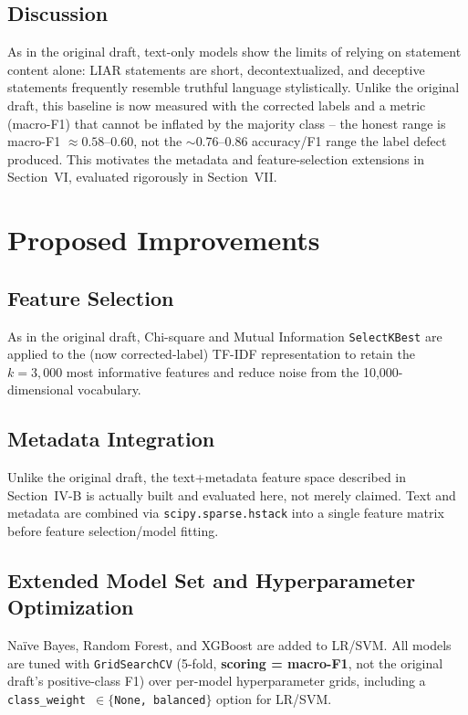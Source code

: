 \documentclass[conference]{IEEEtran}
\begin{document}
\subsection{Discussion}
As in the original draft, text-only models show the limits of relying on
statement content alone: LIAR statements are short, decontextualized, and
deceptive statements frequently resemble truthful language stylistically. Unlike
the original draft, this baseline is now measured with the corrected labels and a
metric (macro-F1) that cannot be inflated by the majority class -- the honest range
is macro-F1 $\approx 0.58$--$0.60$, not the $\sim$0.76--0.86 accuracy/F1 range the
label defect produced. This motivates the metadata and feature-selection
extensions in Section~VI, evaluated rigorously in Section~VII.

\section{Proposed Improvements}
\subsection{Feature Selection}
As in the original draft, Chi-square and Mutual Information \texttt{SelectKBest}
are applied to the (now corrected-label) TF-IDF representation to retain the
$k=3{,}000$ most informative features and reduce noise from the
10,000-dimensional vocabulary.

\subsection{Metadata Integration}
Unlike the original draft, the text+metadata feature space described in
Section~IV-B is actually built and evaluated here, not merely claimed. Text and
metadata are combined via \texttt{scipy.sparse.hstack} into a single feature
matrix before feature selection/model fitting.

\subsection{Extended Model Set and Hyperparameter Optimization}
Na\"ive Bayes, Random Forest, and XGBoost are added to LR/SVM. All models are
tuned with \texttt{GridSearchCV} (5-fold, \textbf{scoring = macro-F1}, not the
original draft's positive-class F1) over per-model hyperparameter grids, including
a \texttt{class\_weight $\in \{$None, balanced$\}$} option for LR/SVM.
\end{document}
